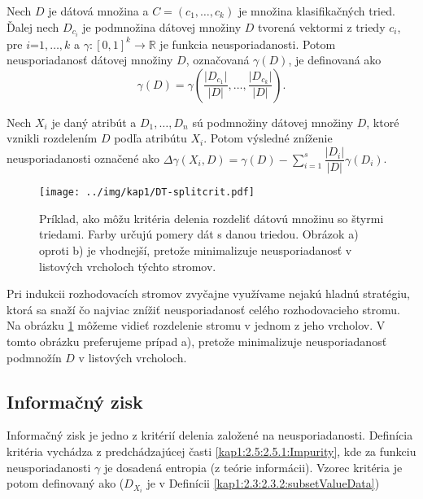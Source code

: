 \begin{def-sk}\label{kap1:2.5:2.5.1:ImpuritySet}
Nech $D$ je dátová množina a $C = (c_{1},\ldots,c_{k})$ je množina klasifikačných tried. Ďalej nech $D_{c_{i}}$ je podmnožina dátovej množiny $D$ tvorená vektormi z triedy $c_{i}$, pre $i$=$1,\ldots,k$ a $\gamma: [0,1]^{k}  \rightarrow \mathbb{R}$ je funkcia neusporiadanosti. Potom neusporiadanosť dátovej množiny $D$, označovaná $\gamma(D)$, je definovaná ako
\begin{equation}
\gamma(D) = \gamma
	\left(
	\dfrac
		{\lvert D_{c_{1}}\lvert}
		{\lvert D \lvert},		
	\ldots,
	\dfrac
		{\lvert D_{c_{k}}\lvert}
		{\lvert D \lvert}				
	\right).
\end{equation}
\end{def-sk}

\begin{def-sk}
Nech $X_{i}$ je daný atribút a $D_{1}, \ldots, D_{n}$ sú podmnožiny dátovej množiny $D$, ktoré vznikli rozdelením $D$ podľa atribútu $X_{i}$. Potom výsledné zníženie neusporiadanosti označené ako $\Delta\gamma(X_{i},D) = \gamma(D) - \sum_{i=1}^{s}\dfrac{\lvert D_{i} \lvert}{\lvert D \lvert} \gamma(D_{i})$.
\end{def-sk}

\begin{figure}[h]
\centering
\centerline{\mbox{\texttt{[image: ../img/kap1/DT-splitcrit.pdf]}}}
\caption{Príklad, ako môžu kritéria delenia rozdeliť dátovú množinu so štyrmi triedami. Farby určujú pomery dát s danou triedou. Obrázok a) oproti b) je vhodnejší, pretože minimalizuje neusporiadanosť v listových vrcholoch týchto stromov.}\label{fig:SplitCriterias}
\end{figure}

Pri indukcii rozhodovacích stromov zvyčajne využívame nejakú hladnú stratégiu, ktorá sa snaží čo najviac znížiť neusporiadanosť celého rozhodovacieho stromu. Na obrázku \ref{fig:SplitCriterias} môžeme vidieť rozdelenie stromu v jednom z jeho vrcholov. V tomto obrázku preferujeme prípad a), pretože minimalizuje neusporiadanosť podmnožín $D$ v listových vrcholoch.
\subsection{Informačný zisk}\label{kap1:2.5:2.5.2:InfoGain} 
Informačný zisk je jedno z kritérií delenia založené na neusporiadanosti. Definícia kritéria vychádza z predchádzajúcej časti \ref{kap1:2.5:2.5.1:Impurity}, kde za funkciu neusporiadanosti $\gamma$ je dosadená entropia (z teórie informácii). Vzorec kritéria je potom definovaný ako ($D_{X_{i}}$ je v Definícii \ref{kap1:2.3:2.3.2:subsetValueData})


